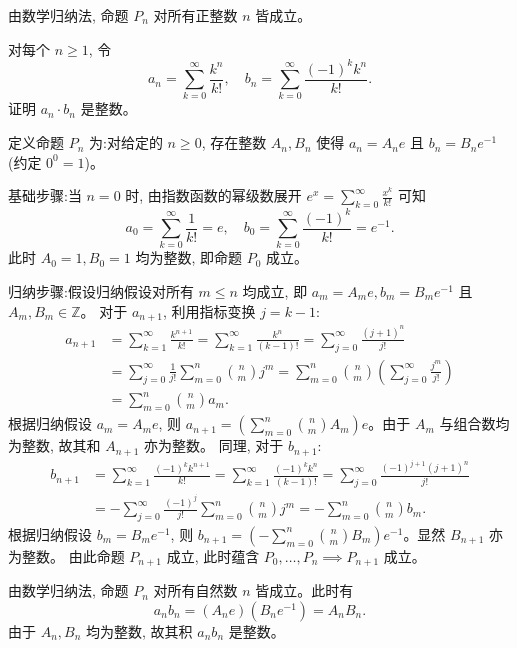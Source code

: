 \begin{questions}
\begin{solution}
        由数学归纳法, 命题 $P_n$ 对所有正整数 $n$ 皆成立。
    \end{solution}

    \question 对每个 $n \ge 1$, 令
    \[
    a_n = \sum_{k=0}^\infty \frac{k^n}{k!}, \quad b_n = \sum_{k=0}^\infty \frac{(-1)^k k^n}{k!}.
    \]
    证明 $a_n \cdot b_n$ 是整数。
    \begin{solution}
        定义命题 $P_n$ 为:对给定的 $n \ge 0$, 存在整数 $A_n, B_n$ 使得 $a_n = A_n e$ 且 $b_n = B_n e^{-1}$ (约定 $0^0=1$)。

        基础步骤:当 $n=0$ 时, 由指数函数的幂级数展开 $e^x = \sum_{k=0}^\infty \frac{x^k}{k!}$ 可知
        \[
        a_0 = \sum_{k=0}^\infty \frac{1}{k!} = e, \quad b_0 = \sum_{k=0}^\infty \frac{(-1)^k}{k!} = e^{-1}.
        \]
        此时 $A_0 = 1, B_0 = 1$ 均为整数, 即命题 $P_0$ 成立。

        归纳步骤:假设归纳假设对所有 $m \le n$ 均成立, 即 $a_m = A_m e, b_m = B_m e^{-1}$ 且 $A_m, B_m \in \mathbb{Z}$。
        对于 $a_{n+1}$, 利用指标变换 $j = k-1$:
        \begin{align}
        a_{n+1} &= \sum_{k=1}^\infty \frac{k^{n+1}}{k!} = \sum_{k=1}^\infty \frac{k^n}{(k-1)!} = \sum_{j=0}^\infty \frac{(j+1)^n}{j!} \\
        &= \sum_{j=0}^\infty \frac{1}{j!} \sum_{m=0}^n \binom{n}{m} j^m = \sum_{m=0}^n \binom{n}{m} \left( \sum_{j=0}^\infty \frac{j^m}{j!} \right) \\
        &= \sum_{m=0}^n \binom{n}{m} a_m.
        \end{align}
        根据归纳假设 $a_m = A_m e$, 则 $a_{n+1} = \left( \sum_{m=0}^n \binom{n}{m} A_m \right) e$。由于 $A_m$ 与组合数均为整数, 故其和 $A_{n+1}$ 亦为整数。
        同理, 对于 $b_{n+1}$:
        \begin{align}
        b_{n+1} &= \sum_{k=1}^\infty \frac{(-1)^k k^{n+1}}{k!} = \sum_{k=1}^\infty \frac{(-1)^k k^n}{(k-1)!} = \sum_{j=0}^\infty \frac{(-1)^{j+1} (j+1)^n}{j!} \\
        &= -\sum_{j=0}^\infty \frac{(-1)^j}{j!} \sum_{m=0}^n \binom{n}{m} j^m = -\sum_{m=0}^n \binom{n}{m} b_m.
        \end{align}
        根据归纳假设 $b_m = B_m e^{-1}$, 则 $b_{n+1} = \left( -\sum_{m=0}^n \binom{n}{m} B_m \right) e^{-1}$。显然 $B_{n+1}$ 亦为整数。
        由此命题 $P_{n+1}$ 成立, 此时蕴含 $P_0, \dots, P_n \implies P_{n+1}$ 成立。

        由数学归纳法, 命题 $P_n$ 对所有自然数 $n$ 皆成立。此时有
        \[
        a_n b_n = (A_n e)(B_n e^{-1}) = A_n B_n.
        \]
        由于 $A_n, B_n$ 均为整数, 故其积 $a_n b_n$ 是整数。
    \end{solution}


\end{questions}
